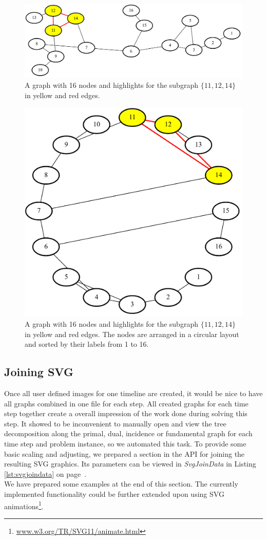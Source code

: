 \documentclass[a4paper, 12pt, bibliography=totoc]{scrartcl}
\begin{document}
\begin{figure}[H]
	\includegraphics[width=\linewidth]{images/minvc16graph9.png}
	\caption[Graph with 16 nodes]{A graph with 16 nodes and highlights for the subgraph $\{11,12,14\}$ in yellow and red edges.}
	\label{fig:minvc16graph9}
\end{figure}

\begin{figure}[H]
	\centering
	\includegraphics[width=0.6\linewidth]{images/minvc16graph9sorted.png}
	\caption[Graph with 16 nodes on a circle]{A graph with 16 nodes and highlights for the subgraph $\{11,12,14\}$ in yellow and red edges. The nodes are arranged in a circular layout and sorted by their labels from 1 to 16.}
	\label{fig:minvc16graph9sorted}
\end{figure}

\subsection{Joining SVG}\label{sec:svgjoin}
Once all user defined images for one timeline are created, it would be nice to have all graphs combined in one file for each step. All created graphs for each time step together create a overall impression of the work done during solving this step. It showed to be inconvenient to manually open and view the tree decomposition along the primal, dual, incidence or fundamental graph for each time step and problem instance, so we automated this task.
 To provide some basic scaling and adjusting, we prepared a section in the API for joining the resulting SVG graphics.
Its parameters can be viewed in \textit{SvgJoinData} in Listing \ref{lst:svgjoindata} on page~\pageref{lst:svgjoindata}. \\
We have prepared some examples at the end of this section.
The currently implemented functionality could be further extended upon using SVG animations\footnote{\url{www.w3.org/TR/SVG11/animate.html}}.\\
\end{document}
